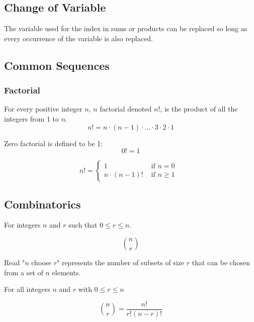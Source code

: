 \documentclass[11pt]{article}
\begin{document}
\subsection{Change of Variable}

The variable used for the index in sums or products can be replaced so long
as every occurrence of the variable is also replaced.

\subsection{Common Sequences}

\subsubsection{Factorial}
\begin{definition}[Factorial]\label{def:factorial}
    For every positive integer $n$, $n$ factorial denoted $n!$,
    is the product of all the integers from 1 to $n$.
    \begin{equation*}
        n! = n \cdot (n - 1) \cdot ... \cdot 3 \cdot 2 \cdot 1
    \end{equation*}
    
    Zero factorial is defined to be 1:
    \begin{equation*}
        0! = 1
    \end{equation*}
\end{definition}

\begin{definition}\label{def:factorial-recursive}
    \begin{equation*}
        n! = 
        \begin{cases}
            1  & \text{ if $n = 0$ } \\
            n \cdot (n - 1)! & \text{ if $n \geq 1$}
        \end{cases}
    \end{equation*}
\end{definition}

\subsection{Combinatorics}

\begin{definition}\label{def:choose}
    For integers $n$ and $r$ such that $0 \leq r \leq n$.

    \begin{equation*}
        {n \choose r}
    \end{equation*}

    Read "$n$ choose $r$" represents the number of subsets of size $r$ that
    can be chosen from a set of $n$ elements.
\end{definition}

\begin{definition}\label{def:combinations}
    For all integers $n$ and $r$ with $0 \leq r \leq n$

    \begin{equation*}
        {n \choose r} = \dfrac{n!}{r!(n - r)!}
    \end{equation*}
\end{definition}
\end{document}

